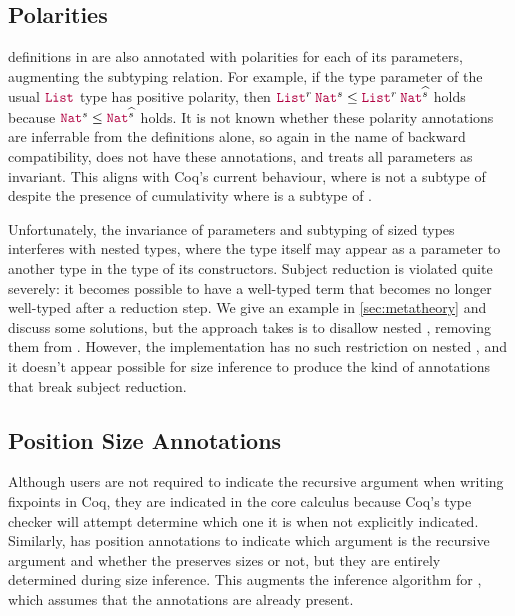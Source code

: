 \subsection{Polarities}

\Coinductive definitions in \CIChatminus are also annotated with polarities for each of its parameters, augmenting the subtyping relation.
For example, if the type parameter of the usual $\List$ type has positive polarity,
then $\app{\List^r}{\Nat^s} \leq \app{\List^r}{\Nat^{\succ{s}}}$ holds
because $\Nat^s \leq \Nat^{\succ{s}}$ holds.
It is not known whether these polarity annotations are inferrable from the \coinductive definitions alone,
so again in the name of backward compatibility, \lang does not have these annotations,
and treats all parameters as invariant.
This aligns with Coq's current behaviour, where  is not a subtype of 
despite the presence of cumulativity where  is a subtype of .

Unfortunately, the invariance of parameters and subtyping of sized \coinductive types interferes with nested \coinductive types,
where the type itself may appear as a parameter to another type in the type of its constructors.
Subject reduction is violated quite severely: it becomes possible to have a well-typed term that becomes no longer well-typed after a reduction step.
We give an example in \autoref{sec:metatheory} and discuss some solutions,
but the approach \lang takes is to disallow nested \coinductives,
removing them from \CIChatminus.
However, the implementation has no such restriction on nested \coinductives,
and it doesn't appear possible for size inference to produce the kind of annotations that break subject reduction.

\subsection{Position Size Annotations}

Although users are not required to indicate the recursive argument when writing fixpoints in Coq,
they are indicated in the core calculus because Coq's type checker will attempt determine which one it is when not explicitly indicated.
Similarly, \lang has position annotations to indicate which argument is the recursive argument and whether the \cofixpoint preserves sizes or not,
but they are entirely determined during size inference.
This augments the inference algorithm for \CIChat,
which assumes that the annotations are already present.

